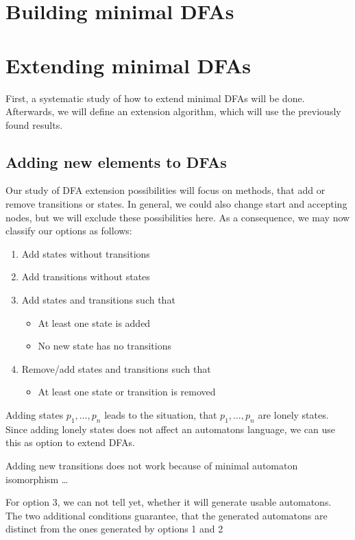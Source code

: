 \documentclass[a4paper, oneside, 11pt]{report}
\theoremstyle{definition}
\theoremstyle{remark}
\begin{document}
\chapter{Building minimal DFAs}

\chapter{Extending minimal DFAs}

First, a systematic study of how to extend minimal DFAs will be done. Afterwards, we will define an extension algorithm, which will use the previously found results.

\section{Adding new elements to DFAs}

Our study of DFA extension possibilities will focus on methods, that add or remove transitions or states. In general, we could also change start and accepting nodes, but we will exclude these possibilities here. As a consequence, we may now classify our options as follows:
\begin{enumerate}
	\item Add states without transitions
	\item Add transitions without states
	\item Add states and transitions such that
	\begin{itemize}
		\item At least one state is added
		\item No new state has no transitions
	\end{itemize}
	\item Remove/add states and transitions such that
	\begin{itemize}
		\item At least one state or transition is removed
	\end{itemize}
\end{enumerate}
Adding states $p_1, \ldots, p_n$ leads to the situation, that $p_1, \ldots, p_n$ are lonely states. Since adding lonely states does not affect an automatons language, we can use this as option to extend DFAs.

Adding new transitions does not work because of minimal automaton isomorphism \ldots

For option 3, we can not tell yet, whether it will generate usable automatons. The two additional conditions guarantee, that the generated automatons are distinct from the ones generated by options 1 and 2 \\
\end{document}

